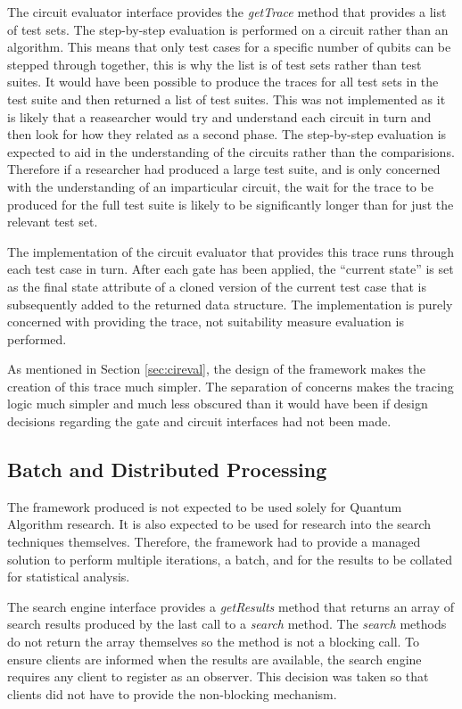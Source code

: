 The circuit evaluator interface provides the \emph{getTrace} method that provides a list of test sets.
The step-by-step evaluation is performed on a circuit rather than an algorithm.
This means that only test cases for a specific number of qubits can be stepped through together, this is why the list is of test sets rather than test suites.
It would have been possible to produce the traces for all test sets in the test suite and then returned a list of test suites.
This was not implemented as it is likely that a reasearcher would try and understand each circuit in turn and then look for how they related as a second phase.
The step-by-step evaluation is expected to aid in the understanding of the circuits rather than the comparisions.
Therefore if a researcher had produced a large test suite, and is only concerned with the understanding of an imparticular circuit, the wait for the trace to be produced for the full test suite is likely to be significantly longer than for just the relevant test set.

The implementation of the circuit evaluator that provides this trace runs through each test case in turn.
After each gate has been applied, the ``current state'' is set as the final state attribute of a cloned version of the current test case that is subsequently added to the returned data structure.
The implementation is purely concerned with providing the trace, not suitability measure evaluation is performed.

As mentioned in Section \ref{sec:cireval}, the design of the framework makes the creation of this trace much simpler.
The separation of concerns makes the tracing logic much simpler and much less obscured than it would have been if design decisions regarding the gate and circuit interfaces had not been made.

\subsection{Batch and Distributed Processing}
The framework produced is not expected to be used solely for Quantum Algorithm research.
It is also expected to be used for research into the search techniques themselves.
Therefore, the framework had to provide a managed solution to perform multiple iterations, a batch, and for the results to be collated for statistical analysis.

The search engine interface provides a \emph{getResults} method that returns an array of search results produced by the last call to a \emph{search} method.
The \emph{search} methods do not return the array themselves so the method is not a blocking call.
To ensure clients are informed when the results are available, the search engine requires any client to register as an observer.
This decision was taken so that clients did not have to provide the non-blocking mechanism.

